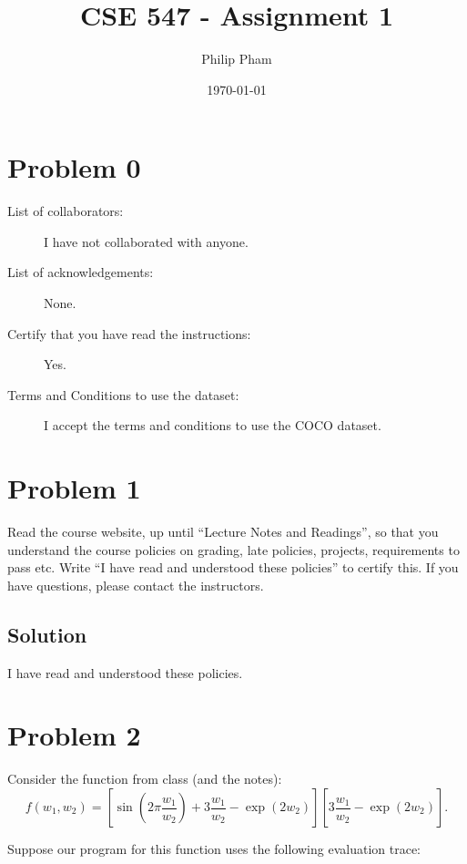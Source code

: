 \documentclass[letterpaper,11pt]{article}
\author{Philip Pham}
\date{\today}
\title{CSE 547 - Assignment 1}
\begin{document}
\maketitle

\section*{Problem 0}

\begin{description}
\item[List of collaborators:] I have not collaborated with anyone.
\item[List of acknowledgements:] None.
\item[Certify that you have read the instructions:] Yes.
\item[Terms and Conditions to use the dataset:] I accept the terms and conditions to use the COCO dataset.  
\end{description}

\section*{Problem 1}

Read the course website, up until ``Lecture Notes and Readings'', so
that you understand the course policies on grading, late policies,
projects, requirements to pass etc. Write ``I have read and understood
these policies'' to certify this. If you have questions, please contact
the instructors.

\subsection*{Solution}

I have read and understood these policies.

\section*{Problem 2}

Consider the function from class (and the notes):
\begin{equation}
  f\left(w_1,w_2\right) = \left[\sin\left(2\pi\frac{w_1}{w_2}\right) + 3\frac{w_1}{w_2} - \exp\left(2w_2\right)\right]\left[3\frac{w_1}{w_2} - \exp\left(2w_2\right)\right].
\end{equation}

Suppose our program for this function uses the following evaluation trace:
\end{document}
